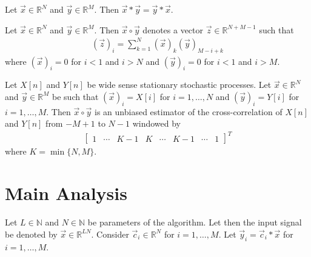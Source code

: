 \documentclass[a4paper, openany, oneside]{memoir}
\begin{document}
\begin{blockTheorem} \label{th:conv-comm}
    Let $\vec{x} \in \mathbb{R}^N$ and $\vec{y} \in \mathbb{R}^M$. Then $\vec{x} \ast \vec{y} = \vec{y} \ast \vec{x}$.
\end{blockTheorem}

\begin{blockDefinition}
    Let $\vec{x} \in \mathbb{R}^N$ and $\vec{y} \in \mathbb{R}^M$. Then $\vec{x} \circ \vec{y}$ denotes a vector $\vec{z} \in \mathbb{R}^{N+M-1}$ such that
    \begin{align*}
        (\vec{z})_i = \sum_{k=1}^{N} (\vec{x})_k (\vec{y})_{M-i+k}
    \end{align*}
    where $(\vec{x})_i=0$ for $i < 1$ and $i > N$ and $(\vec{y})_i=0$ for $i < 1$ and $i > M$.
\end{blockDefinition}

\begin{blockTheorem} \label{th:corr-unbiased}
    Let $X[n]$ and $Y[n]$ be wide sense stationary stochastic processes. Let $\vec{x} \in \mathbb{R}^N$ and $\vec{y} \in \mathbb{R}^M$ be such that $(\vec{x})_i = X[i]$ for $i=1,\ldots,N$ and $(\vec{y})_i = Y[i]$ for $i=1,\ldots,M$. Then $\vec{x} \circ \vec{y}$ is an unbiased estimator of the cross-correlation of $X[n]$ and $Y[n]$ from $-M+1$ to $N-1$ windowed by
    \begin{align*}
        \begin{bmatrix}
            1 & \cdots & K - 1 & K & \cdots & K - 1 & \cdots & 1
        \end{bmatrix}^T
    \end{align*}
    where $K = \min\{N,M\}$.
\end{blockTheorem}

\section{Main Analysis}

Let $L \in \mathbb{N}$ and $N \in \mathbb{N}$ be parameters of the algorithm. Let then the input signal be denoted by $\vec{x} \in \mathbb{R}^{LN}$. Consider $\vec{c}_i \in \mathbb{R}^{N}$ for $i = 1,\ldots,M$. Let $\vec{y}_i = \vec{c}_i \ast \vec{x}$ for $i = 1,\ldots,M$.

\begin{blockTheorem} \label{th:conv-corr}
\end{blockTheorem}
\end{document}
